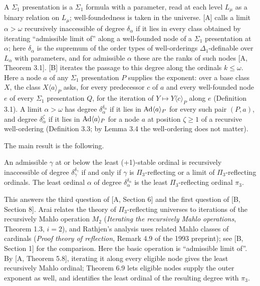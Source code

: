 \documentclass[11pt]{article}
\begin{document}
A $\Sigma_1$ presentation is a $\Sigma_1$ formula with a parameter, read at each level $L_\mu$ as a binary relation on
$L_\mu$; well-foundedness is taken in the universe. [A] calls a limit $\alpha > \omega$ recursively inaccessible of
degree $\delta_\alpha$ if it lies in every class obtained by iterating ``admissible limit of'' along a well-founded node
of a $\Sigma_1$ presentation at $\alpha$; here $\delta_\alpha$ is the supremum of the order types of well-orderings
$\Delta_1$-definable over $L_\alpha$ with parameters, and for admissible $\alpha$ these are the ranks of such nodes [A,
Theorem 3.1]. [B] iterates the passage to this degree along the ordinals $k \le \omega$. Here a node $a$ of any
$\Sigma_1$ presentation $P$ supplies the exponent: over a base class $X$, the class $X\langle a\rangle_P$ asks, for
every predecessor $c$ of $a$ and every well-founded node $e$ of every $\Sigma_1$ presentation $Q$, for the iteration of
$Y \mapsto Y\langle c\rangle_P$ along $e$ (Definition 3.1). A limit $\alpha > \omega$ has degree
$\delta_\alpha^{\delta_\alpha}$ if it lies in $\mathrm{Ad}\langle a\rangle_P$ for every such pair $(P,a)$, and degree
$\delta_\alpha^\zeta$ if it lies in $\mathrm{Ad}\langle a\rangle_P$ for a node $a$ at position $\zeta \ge 1$ of a recursive
well-ordering (Definition 3.3; by Lemma 3.4 the well-ordering does not matter).

The main result is the following.

\begin{statement} An admissible $\gamma$ at or below the least (+1)-stable ordinal is
recursively inaccessible of degree
$\delta_\gamma^{\delta_\gamma}$ if and only if $\gamma$ is $\Pi_3$-reflecting or a limit of $\Pi_3$-reflecting
ordinals. The least ordinal $\alpha$ of degree $\delta_\alpha^{\delta_\alpha}$ is the least $\Pi_3$-reflecting ordinal
$\pi_3$.
\end{statement}

This answers the third question of [A, Section 6] and the first question of
[B, Section 8]. Arai relates the theory of $\Pi_3$-reflecting universes to iterations of the recursively Mahlo
operation $M_2$ (\emph{Iterating the recursively Mahlo operations}, Theorem 1.3, $i = 2$), and Rathjen's analysis uses
related Mahlo classes of cardinals (\emph{Proof theory of reflection}, Remark 4.9 of the 1993 preprint); see [B,
Section 1] for the comparison. Here the basic operation is ``admissible limit of''. By [A, Theorem 5.8], iterating it
along every eligible node gives the least recursively Mahlo ordinal; Theorem 6.9 lets eligible nodes supply the outer
exponent as well, and identifies the least ordinal of the resulting degree with $\pi_3$.
\end{document}
